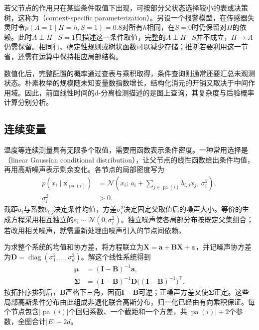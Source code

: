若父节点的作用只在某些条件取值下出现，可按部分父状态选择较小的表或决策树，这称为（context-specific parameterization）。另设一个报警模型，在传感器失灵时令$p(A=1\mid H=h,S=1)=0.8$对所有$h$相同，在$S=0$时仍保留对$H$的依赖。此时$A\perp H\mid S=1$只描述这一条件取值，完整的$A\perp H\mid S$并不成立，$H\to A$仍需保留。相同行、确定性规则或树状函数可以减少存储；推断若要利用这一节省，还需在运算中保持相应局部结构。

数值化后，完整配置的概率通过查表与乘积取得，条件查询则通常还要汇总未观测状态。朴素枚举的规模随未知变量数指数增长，结构化消元的开销又取决于中间作用域。因此，前面线性时间的d-分离检测描述的是图上查询，其复杂度与后验概率计算分别分析。

\subsection{连续变量}
\label{sec:pgm-directed-continuous}

温度等连续测量具有无限多个取值，需要用函数表示条件密度。一种常用选择是（linear Gaussian conditional distribution），让父节点的线性函数给出条件均值，再用高斯噪声表示剩余变化。各节点的局部密度写为
\begin{equation}
  \begin{aligned}
    p(x_i\mid\bm{x}_{\operatorname{pa}(i)})
      &=\mathcal N\left(
        x_i;\,a_i+\sum_{j\in\operatorname{pa}(i)}b_{i,j}x_j,\,
        \sigma_i^2\right),\\
    \sigma_i^2&>0.
  \end{aligned}
  \label{eq:pgm-directed-linear-gaussian}
\end{equation}
截距$a_i$与系数$b_{i,j}$决定条件均值，方差$\sigma_i^2$决定固定父取值后的噪声大小。等价的生成方程采用相互独立的$\varepsilon_i\sim\mathcal N(0,\sigma_i^2)$。独立噪声使各局部分布按既定父集组合；若改用相关噪声，就需重新处理由噪声引入的节点间依赖。

为求整个系统的均值和协方差，将方程联立为$\bm X=\bm a+\bm B\bm X+\bm\varepsilon$，并记噪声协方差为$\bm D=\operatorname{diag}(\sigma_1^2,\ldots,\sigma_d^2)$。解这个线性系统得到
\[
  \begin{aligned}
    \bm{\mu}&=(\bm I-\bm B)^{-1}\bm a,\\
    \bm{\Sigma}&=(\bm I-\bm B)^{-1}
      \bm D\bigl((\bm I-\bm B)^{-1}\bigr)^{\top}.
  \end{aligned}
\]
按拓扑序排列后，$\bm B$严格下三角，因而$\bm I-\bm B$可逆；正噪声方差又使$\bm\Sigma$正定。这些局部高斯条件分布由此组成非退化联合高斯分布，归一化已经由有向乘积保证。每个节点包含$|\operatorname{pa}(i)|$个回归系数、一个截距和一个方差，共$|\operatorname{pa}(i)|+2$个参数，全图合计$|E|+2d$。

